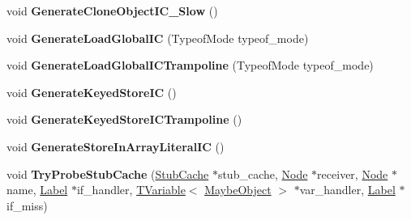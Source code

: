 \begin{DoxyCompactItemize}
\mbox{\label{classv8_1_1internal_1_1AccessorAssembler_a6ec83695032cac953966bf680fed5d70}} 
void {\bfseries Generate\+Clone\+Object\+I\+C\+\_\+\+Slow} ()
\item 
\mbox{\label{classv8_1_1internal_1_1AccessorAssembler_afbc89049e6575b3b24a150fd1c4f8363}} 
void {\bfseries Generate\+Load\+Global\+IC} (Typeof\+Mode typeof\+\_\+mode)
\item 
\mbox{\label{classv8_1_1internal_1_1AccessorAssembler_a3836b2d01020ddcf406b92a2b7f74f6c}} 
void {\bfseries Generate\+Load\+Global\+I\+C\+Trampoline} (Typeof\+Mode typeof\+\_\+mode)
\item 
\mbox{\label{classv8_1_1internal_1_1AccessorAssembler_a39fd539fa6323ddd8ce611d67113e241}} 
void {\bfseries Generate\+Keyed\+Store\+IC} ()
\item 
\mbox{\label{classv8_1_1internal_1_1AccessorAssembler_a90ee1401264405f6e5f341aa7c6562bc}} 
void {\bfseries Generate\+Keyed\+Store\+I\+C\+Trampoline} ()
\item 
\mbox{\label{classv8_1_1internal_1_1AccessorAssembler_a58b259d4bf86ef2e4fa32465a37a14a4}} 
void {\bfseries Generate\+Store\+In\+Array\+Literal\+IC} ()
\item 
\mbox{\label{classv8_1_1internal_1_1AccessorAssembler_a2660145f33a4d35f58611986ada0310c}} 
void {\bfseries Try\+Probe\+Stub\+Cache} (\mbox{\hyperlink{classv8_1_1internal_1_1StubCache}{Stub\+Cache}} $\ast$stub\+\_\+cache, \mbox{\hyperlink{classv8_1_1internal_1_1compiler_1_1Node}{Node}} $\ast$receiver, \mbox{\hyperlink{classv8_1_1internal_1_1compiler_1_1Node}{Node}} $\ast$name, \mbox{\hyperlink{classv8_1_1internal_1_1compiler_1_1CodeAssemblerLabel}{Label}} $\ast$if\+\_\+handler, \mbox{\hyperlink{classv8_1_1internal_1_1compiler_1_1TypedCodeAssemblerVariable}{T\+Variable}}$<$ \mbox{\hyperlink{classv8_1_1internal_1_1MaybeObject}{Maybe\+Object}} $>$ $\ast$var\+\_\+handler, \mbox{\hyperlink{classv8_1_1internal_1_1compiler_1_1CodeAssemblerLabel}{Label}} $\ast$if\+\_\+miss)

\end{DoxyCompactItemize}
